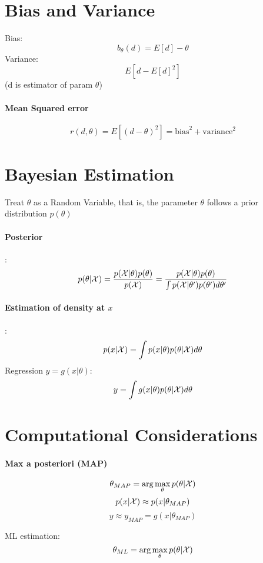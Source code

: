 \section{Bias and Variance} 
Bias: \[b_\theta(d) = E[d] - \theta\]
Variance: \[E[d-{E[d]}^2]\](d is estimator of param $\theta$)

\paragraph{Mean Squared error}
\[r(d,\theta) = E[{(d-\theta)}^2]= \mbox{bias}^2 + \mbox{variance}^2\]
\section{Bayesian Estimation} Treat $\theta$ as a Random Variable,  that
is, the parameter $\theta$ follows a prior distribution $p(\theta)$
\paragraph{Posterior}: 
    \[p(\theta|\mathcal{X}) = \frac{p(\mathcal{X}|\theta)p(\theta)}{p(\mathcal{X})} =
    \frac{p(\mathcal{X}|\theta)p(\theta)}{ \int
    p(\mathcal{X}|\theta')p(\theta')d\theta'}\]
    \paragraph{Estimation of density at $x$}: 
    \[p(x|\mathcal{X}) = \int p(x|\theta)p(\theta|\mathcal{X})d\theta\]
    Regression $y = g(x|\theta)$:
    \[ y = \int g(x|\theta)p(\theta|\mathcal{X})d\theta \]
\section{Computational Considerations}
\paragraph{Max a posteriori (MAP)}
\[\theta_{MAP}=\arg\max_{\theta}p(\theta|\mathcal{X})\]
\[p(x|\mathcal{X}) \approx p(x|\theta_{MAP})\] \[y\approx y_{MAP} =
    g(x|\theta_{MAP})\]

    ML estimation: \[\theta_{ML} = \arg \max_{\theta} p(\theta|\mathcal{X})\]

